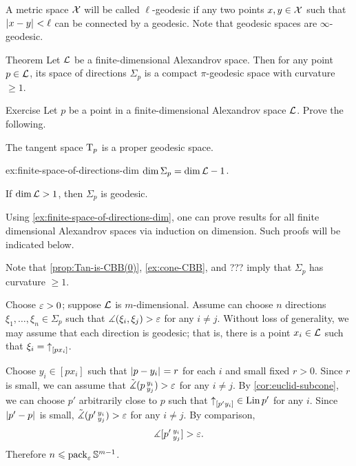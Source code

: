 A metric space $\mathcal{X}$ will be called $\ell$-geodesic 
if any two points $x,y\in\mathcal{X}$ such that $\dist{x}{y}{}<\ell$ can be connected by a geodesic.
Note that geodesic spaces are $\infty$-geodesic.

\begin{thm}{Theorem}\label{thm:finite-space-of-directions}
Let $\mathcal{L}$ be a finite-dimensional Alexandrov space.
Then for any point $p\in \mathcal{L}$, its space of directions $\Sigma_p$ is a compact $\pi$-geodesic space with curvature $\ge1$.
\end{thm}


\begin{thm}{Exercise}\label{ex:finite-tan}
Let $p$ be a point in a finite-dimensional Alexandrov space $\mathcal{L}$.
Prove the following.
\begin{subthm}{}
The tangent space $\mathrm{T}_p$ is a proper geodesic space.
\end{subthm}

\begin{subthm}{ex:finite-space-of-directions-dim}
$\operatorname{\rm dim}\nolimits\Sigma_p=\operatorname{\rm dim}\nolimits\mathcal{L}-1$.
\end{subthm}

\begin{subthm}{}
If $\operatorname{\rm dim}\nolimits \mathcal{L}>1$, then $\Sigma_p$ is geodesic.
\end{subthm}


\end{thm}

Using \ref{ex:finite-space-of-directions-dim}, one can prove results for all finite dimensional Alexandrov spaces via induction on  dimension.
Such proofs will be indicated below.

Note that \ref{prop:Tan-is-CBB(0)}, \ref{ex:cone-CBB}, and ??? imply that $\Sigma_p$ has curvature $\ge1$.

Choose $\varepsilon>0$; suppose $\mathcal{L}$ is $m$-dimensional.
Assume can choose $n$ directions $\xi_1,\dots, \xi_n\in \Sigma_p$ such that $\mangle(\xi_i,\xi_j)\z>\eps$ for any $i\ne j$.
Without loss of generality, we may assume that each direction is geodesic;
that is, there is a point $x_i\in \mathcal{L}$ such that $\xi_i={\uparrow}_{[{p}{x_i}]}$.

Choose $y_i\in [px_i]$ such that $\dist{p}{y_i}{}=r$ for each $i$ and small fixed $r>0$.
Since $r$ is small, we can assume that $\tilde\measuredangle(p\,{}^{y_i}_{y_j})>\varepsilon$ for any $i\ne j$.
By \ref{cor:euclid-subcone}, we can choose $p'$ arbitrarily close to $p$ such that ${\uparrow}_{[{p'}{y_i}]}\in \mathop{\rm Lin}\nolimits{p'}$ for any $i$.
Since  $\dist{p'}{p}{}$ is small, $\tilde\measuredangle(p'\,{}^{y_i}_{y_j})>\varepsilon$ for any $i\ne j$.
By comparison, 
\[\measuredangle [p'\,{}^{y_i}_{y_j}]>\varepsilon.\]
Therefore $n\leqslant \operatorname{\rm pack}\nolimits_\varepsilon\mathbb{S}^{m-1}$.


